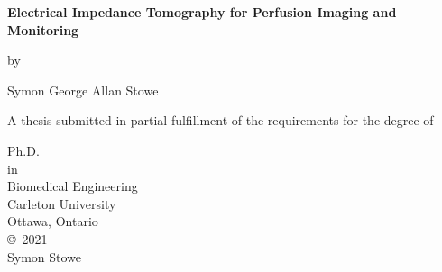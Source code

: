 
\thispagestyle{empty}
\begin{center}

\LARGE

\textbf{Electrical Impedance Tomography for Perfusion Imaging and Monitoring}

\vspace{6mm}
\large
by 

\vspace{-2mm}
\LARGE
Symon George Allan Stowe

\vspace{15mm}
\large
A thesis submitted in partial fulfillment of 
the requirements for the degree of

\vspace{12mm}
\large
Ph.D.\\

in \\

\vspace{1mm}
Biomedical Engineering\\

\vspace{12mm}
\large
Carleton University \\
Ottawa, Ontario\\

\vspace{12mm}
\large
\copyright~2021 \\
Symon Stowe
\end{center}
